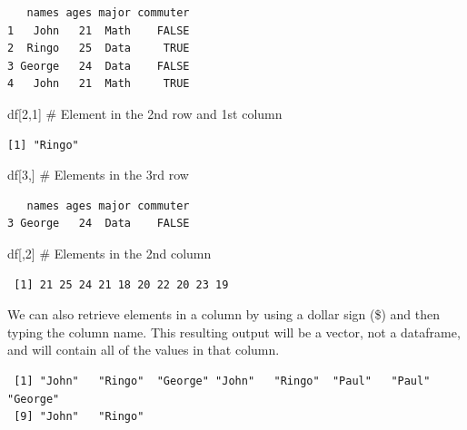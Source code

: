 \documentclass[
  letterpaper,
  DIV=11,
  numbers=noendperiod]{scrreprt}
\newenvironment{Shaded}{\begin{snugshade}}{\end{snugshade}}
\newcommand{\CommentTok}[1]{\textcolor[rgb]{0.37,0.37,0.37}{#1}}
\newcommand{\DecValTok}[1]{\textcolor[rgb]{0.68,0.00,0.00}{#1}}
\newcommand{\NormalTok}[1]{\textcolor[rgb]{0.00,0.23,0.31}{#1}}
\newcommand{\SpecialCharTok}[1]{\textcolor[rgb]{0.37,0.37,0.37}{#1}}
\begin{document}
\begin{verbatim}
   names ages major commuter
1   John   21  Math    FALSE
2  Ringo   25  Data     TRUE
3 George   24  Data    FALSE
4   John   21  Math     TRUE
\end{verbatim}

\begin{Shaded}
\begin{Highlighting}[]
\NormalTok{df[}\DecValTok{2}\NormalTok{,}\DecValTok{1}\NormalTok{] }\CommentTok{\# Element in the 2nd row and 1st column}
\end{Highlighting}
\end{Shaded}

\begin{verbatim}
[1] "Ringo"
\end{verbatim}

\begin{Shaded}
\begin{Highlighting}[]
\NormalTok{df[}\DecValTok{3}\NormalTok{,] }\CommentTok{\# Elements in the 3rd row}
\end{Highlighting}
\end{Shaded}

\begin{verbatim}
   names ages major commuter
3 George   24  Data    FALSE
\end{verbatim}

\begin{Shaded}
\begin{Highlighting}[]
\NormalTok{df[,}\DecValTok{2}\NormalTok{] }\CommentTok{\# Elements in the 2nd column}
\end{Highlighting}
\end{Shaded}

\begin{verbatim}
 [1] 21 25 24 21 18 20 22 20 23 19
\end{verbatim}

We can also retrieve elements in a column by using a dollar sign (\$)
and then typing the column name. This resulting output will be a vector,
not a dataframe, and will contain all of the values in that column.

\begin{Shaded}
\end{Shaded}

\begin{verbatim}
 [1] "John"   "Ringo"  "George" "John"   "Ringo"  "Paul"   "Paul"   "George"
 [9] "John"   "Ringo" 
\end{verbatim}
\end{document}

